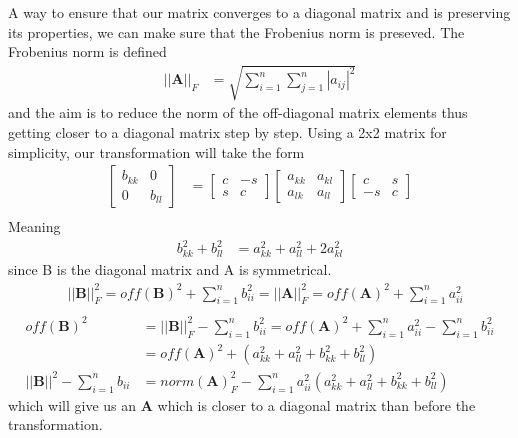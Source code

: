 \documentclass[10pt]{article}
\begin{document}
\begin{multicols}{2}
A way to ensure that our matrix converges to a diagonal matrix and is
preserving its properties, we can make sure that the Frobenius norm is
preseved. The Frobenius norm is defined
\begin{align*}
    \left|\left|\textbf{A}\right|\right|_F &= \sqrt{\sum_{i=1}^n\sum_{j=1}^n|a_{ij}|^2}
\end{align*}
and the aim is to reduce the norm of the off-diagonal matrix elements thus
getting closer to a diagonal matrix step by step. Using a 2x2 matrix for
simplicity, our transformation will take the form
\begin{align*}
    \begin{bmatrix}
        b_{kk} & 0\\
        0 & b_{ll}
    \end{bmatrix}&=
    \begin{bmatrix}
        c & -s\\
        s & c
    \end{bmatrix}
    \begin{bmatrix}
        a_{kk} & a_{kl}\\
        a_{lk} & a_{ll}
    \end{bmatrix}
    \begin{bmatrix}
        c & s\\
        -s & c
    \end{bmatrix}\\
\end{align*}
Meaning
\begin{align*}
    b_{kk}^2+b_{ll}^2 &= a_{kk}^2+a_{ll}^2+2a_{kl}^2
\end{align*}
since B is the diagonal matrix and A is symmetrical.
\begin{align*}
    &\boxed{||\textbf{B}||_F^2 = off(\textbf{B})^2+\sum_{i=1}^nb_{ii}^2 =||\textbf{A}||_F^2 = off(\textbf{A})^2+\sum_{i=1}^na_{ii}^2}\\
\end{align*}
\begin{align*}
    off(\textbf{B})^2 &= ||\textbf{B}||_F^2 -\sum_{i=1}^nb_{ii}^2
    = off(\textbf{A})^2 + \sum_{i=1}^na_{ii}^2 -\sum_{i=1}^nb_{ii}^2\\
    &= off(\textbf{A})^2+\left(a_{kk}^2+a_{ll}^2+b_{kk}^2+b_{ll}^2\right)\\
    ||\textbf{B}||^2-\sum_{i=1}^nb_{ii} &= norm(\textbf{A})_F^2-\sum_{i=1}^na_{ii}^2\left(a_{kk}^2+a_{ll}^2+b_{kk}^2+b_{ll}^2\right)
\end{align*}
which will give us an $\textbf{A}$ which is closer to a diagonal matrix
than before the transformation.




\end{multicols}
\end{document}
